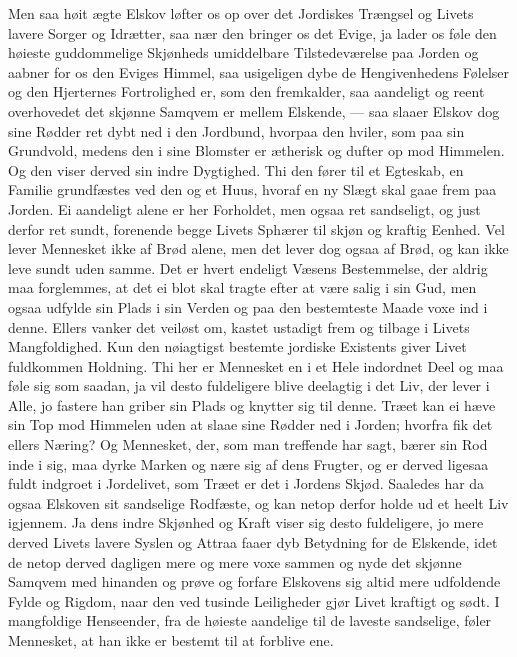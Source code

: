 \documentclass[12pt,a4paper]{book}
\newcommand{\apage}[1]{\marginnote{\footnotesize\textit{[#1]}}}
\begin{document}
Men saa høit ægte Elskov løfter os op over det Jordiskes Trængsel og
Livets lavere Sorger og Idrætter, saa nær den bringer os det Evige, ja
lader os føle den høieste guddommelige Skjønheds umiddelbare
Tilstedeværelse paa Jorden og aabner for os den Eviges Himmel, saa
usigeligen dybe de Hengivenhedens Følelser og den Hjerternes
Fortrolighed er, som den fremkalder, saa aandeligt og reent overhovedet
det skjønne Samqvem er mellem Elskende, --- saa slaaer Elskov dog sine
Rødder ret dybt ned i den Jordbund, hvorpaa den hviler, som paa sin
Grundvold, medens den i sine Blomster er ætherisk og dufter op mod
Himmelen. \apage{38}
Og den viser derved sin indre Dygtighed. Thi den fører til et Egteskab,
en Familie grundfæstes ved den og et Huus, hvoraf en ny Slægt skal gaae
frem paa Jorden. Ei aandeligt alene er her Forholdet, men ogsaa ret
sandseligt, og just derfor ret sundt, forenende begge Livets Sphærer
til skjøn og kraftig Eenhed. Vel lever Mennesket ikke af Brød alene,
men det lever dog ogsaa af Brød, og kan ikke leve sundt uden samme. Det
er hvert endeligt Væsens Bestemmelse, der aldrig maa forglemmes, at det
ei blot skal tragte efter at være salig i sin Gud, men ogsaa udfylde
sin Plads i sin Verden og paa den bestemteste Maade voxe ind i denne.
Ellers vanker det veiløst om, kastet ustadigt frem og tilbage i Livets
Mangfoldighed. Kun den nøiagtigst bestemte jordiske Existents giver
Livet fuldkommen Holdning. Thi her er Mennesket en i et Hele indordnet
Deel og maa føle sig som saadan, ja vil desto fuldeligere blive
deelagtig i det Liv, der lever i Alle, jo fastere han griber sin Plads
og knytter sig til denne. Træet kan ei hæve sin Top mod Himmelen uden
at slaae sine Rødder ned i Jorden; hvorfra fik det ellers Næring? Og
Mennesket, der, som man treffende har sagt, bærer sin Rod inde i sig,
maa dyrke Marken og nære sig af dens Frugter, og er derved ligesaa
fuldt indgroet i Jordelivet, som Træet er det i Jordens Skjød. Saaledes
har da ogsaa Elskoven sit sandselige Rodfæste, og kan netop derfor holde
ud et heelt Liv igjennem. Ja dens indre Skjønhed og \apage{39} Kraft viser sig
desto fuldeligere, jo mere derved Livets lavere Syslen og Attraa faaer
dyb Betydning for de Elskende, idet de netop derved dagligen mere og
mere voxe sammen og nyde det skjønne Samqvem med hinanden og prøve og
forfare Elskovens sig altid mere udfoldende Fylde og Rigdom, naar den
ved tusinde Leiligheder gjør Livet kraftigt og sødt. I mangfoldige
Henseender, fra de høieste aandelige til de laveste sandselige, føler
Mennesket, at han ikke er bestemt til at forblive ene.
\end{document}
